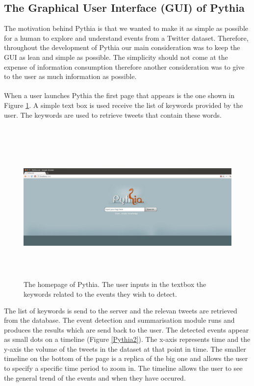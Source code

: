\subsection{The Graphical User Interface (GUI) of Pythia}
The motivation behind Pythia is that we wanted to make it as simple as possible for a human to explore and understand events from a Twitter dataset. Therefore, throughout  
the development of Pythia our main consideration was to keep the GUI as lean and simple as possible. The simplicity should not come at the expense of information consumption therefore
another consideration was to give to the user as much information as possible.\\\\
When a user launches Pythia the first page that appears is the one shown in Figure \ref{Pythia1}. A simple text box is used receive the list of keywords provided by the user. The keywords are used to retrieve tweets that contain these words.\\\\
\begin{figure}[htbp]
  \begin{center}
    \includegraphics[height=3in, width=6in]{pythia1}
    \caption{The homepage of Pythia. The user inputs in the textbox the keywords related to the events they wish to detect.}
    \label{Pythia1}
  \end{center}
\end{figure} 
The list of keywords is send to the server and the relevan tweets are retrieved from the database. The event detection and summarisation module runs and produces the results which are send back to the user. The detected events appear as small dots on a timeline (Figure \ref{Pythia2}). The x-axis represents time and the y-axis the volume of the tweets in the dataset at that point in time. The smaller timeline on the bottom of the page is a replica of the big one and allows the user to specify a specific time period to zoom in. The timeline allows the user to see the general trend of the events and when they have occured.\\\\    
